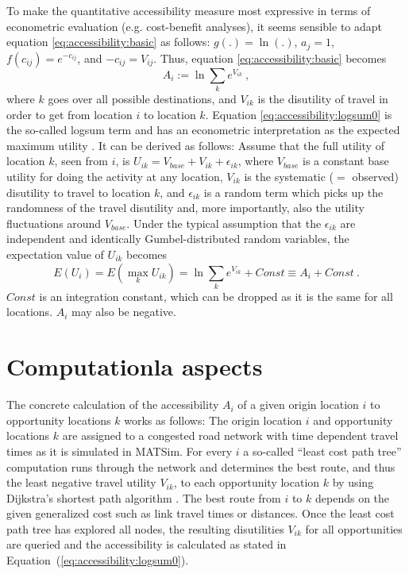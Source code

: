 To make the quantitative accessibility measure most expressive in terms of econometric evaluation (e.g. cost-benefit analyses), it seems sensible to adapt equation \ref{eq:accessibility:basic} as follows: $g(.) = \ln(.)$, $a_j = 1$, $f(c_{ij}) = e^{-c_{ij}}$, and $-c_{ij} = V_{ij}$. Thus, equation \ref{eq:accessibility:basic} becomes
\begin{equation}
A_i := \ln \sum_k e^{V_{ik}} \ ,
\label{eq:accessibility:logsum0}
\end{equation}
where $k$ goes over all possible destinations, and $V_{ik}$ is the
disutility of travel in order to get from location $i$ to location
$k$. Equation \ref{eq:accessibility:logsum0} is the so-called logsum term and has an econometric interpretation as the expected maximum utility \citep[e.g.][]{Ben-AkivaBook}. It can be derived as follows: Assume that the full utility of location $k$, seen from $i$, is $U_{ik} = V_{base} + V_{ik} + \epsilon_{ik}$, where $V_{base}$ is a constant base utility for doing the activity at any location, $V_{ik}$ is the systematic ($=$ observed) disutility to travel to location $k$, and $\epsilon_{ik}$ is a random term which picks up the randomness of the travel disutility and, more importantly, also the utility fluctuations around $V_{base}$.  Under the typical assumption that the $\epsilon_{ik}$ are independent and identically Gumbel-distributed random variables, the expectation value of $U_{ik}$ becomes
\begin{equation}
E(U_i) = E(\max_k U_{ik}) = \ln \sum_k e^{V_{ik}} + Const \equiv A_i + Const \ .
\end{equation}
$Const$ is an integration constant, which can be dropped as it is the same for all locations. $A_i$ may also be negative.


\section{Computationla aspects}

The concrete calculation of the accessibility $A_i$ of a given origin location $i$ to opportunity locations $k$ works as follows: The origin location $i$ and opportunity locations $k$ are assigned to a congested road network with time dependent travel times as it is simulated in MATSim. For every $i$ a so-called ``least cost path tree'' computation runs through the network and determines the best route, and thus the least negative travel utility $V_{ik}$, to each opportunity location $k$ by using Dijkstra's shortest path algorithm \citep{Dijkstra1959ShortestPath}. The best route from $i$ to $k$ depends on the given generalized cost such as link travel times or distances. Once the least cost path tree has explored all nodes, the resulting disutilities $V_{ik}$ for all opportunities are queried and the accessibility is calculated as stated in Equation~(\ref{eq:accessibility:logsum0}).


